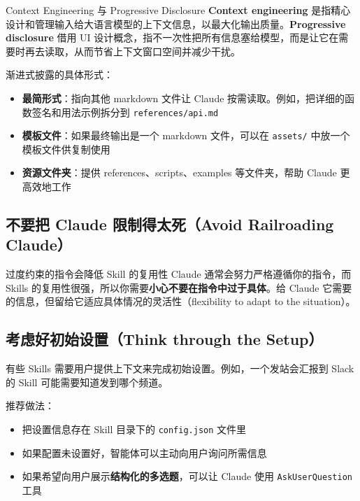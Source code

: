 \begin{knowledgebox}{Context Engineering 与 Progressive Disclosure}
\textbf{Context engineering} 是指精心设计和管理输入给大语言模型的上下文信息，以最大化输出质量。\textbf{Progressive disclosure} 借用 UI 设计概念，指不一次性把所有信息塞给模型，而是让它在需要时再去读取，从而节省上下文窗口空间并减少干扰。
\end{knowledgebox}

渐进式披露的具体形式：
\begin{itemize}
    \item \textbf{最简形式}：指向其他 markdown 文件让 Claude 按需读取。例如，把详细的函数签名和用法示例拆分到 \texttt{references/api.md}
    \item \textbf{模板文件}：如果最终输出是一个 markdown 文件，可以在 \texttt{assets/} 中放一个模板文件供复制使用
    \item \textbf{资源文件夹}：提供 references、scripts、examples 等文件夹，帮助 Claude 更高效地工作
\end{itemize}

\subsection{不要把 Claude 限制得太死（Avoid Railroading Claude）}

\begin{warningbox}{过度约束的指令会降低 Skill 的复用性}
Claude 通常会努力严格遵循你的指令，而 Skills 的复用性很强，所以你需要\textbf{小心不要在指令中过于具体}。给 Claude 它需要的信息，但留给它适应具体情况的灵活性（flexibility to adapt to the situation）。
\end{warningbox}

\subsection{考虑好初始设置（Think through the Setup）}

有些 Skills 需要用户提供上下文来完成初始设置。例如，一个发站会汇报到 Slack 的 Skill 可能需要知道发到哪个频道。

推荐做法：
\begin{itemize}
    \item 把设置信息存在 Skill 目录下的 \texttt{config.json} 文件里
    \item 如果配置未设置好，智能体可以主动向用户询问所需信息
    \item 如果希望向用户展示\textbf{结构化的多选题}，可以让 Claude 使用 \texttt{AskUserQuestion} 工具
\end{itemize}

